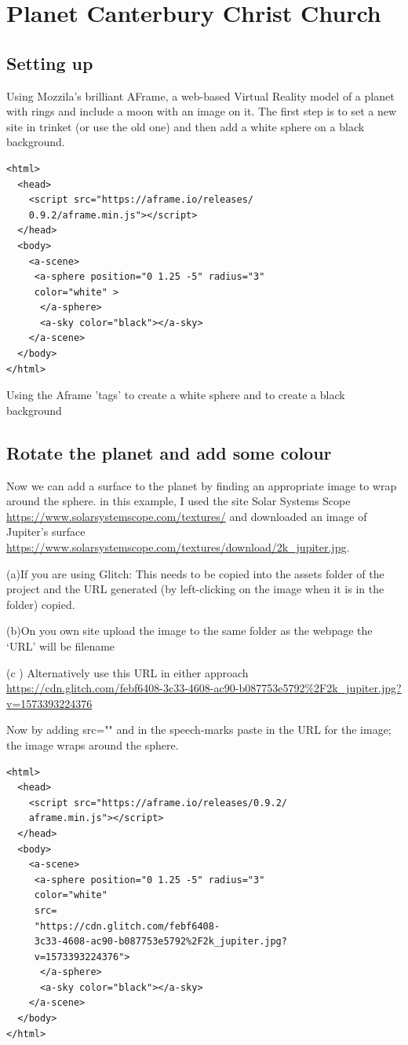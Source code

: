 \chapter{Planet Canterbury \newline Christ Church}
\section{Setting up}
Using Mozzila's brilliant AFrame, a web-based Virtual Reality model of a planet with rings and include a moon with an image on it.
The first step is to set a new site in trinket (or use the old one)  and then add a white sphere on a black background.
\begin{lstlisting}
<html>
  <head>
    <script src="https://aframe.io/releases/
    0.9.2/aframe.min.js"></script>
  </head>
  <body>
    <a-scene>
     <a-sphere position="0 1.25 -5" radius="3" 
     color="white" >
      </a-sphere>   
      <a-sky color="black"></a-sky>
    </a-scene>
  </body>
</html>
\end{lstlisting}

Using the Aframe 'tags' to create a white sphere and to create a black background

\section{Rotate the planet and add some colour}
Now we can add a surface to the planet by finding an appropriate image to wrap around the sphere. in this example, I used the site Solar Systems Scope \url{https://www.solarsystemscope.com/textures/} and downloaded an image of Jupiter's surface \url{https://www.solarsystemscope.com/textures/download/2k_jupiter.jpg}.

 

(a)If you are using Glitch: This needs to be copied into the assets folder of the project and the URL generated (by left-clicking on the image when it is in the folder) copied.

(b)On you own site upload the image to the same folder as the webpage the ‘URL’ will be filename

(c ) Alternatively use this URL in either approach \url{https://cdn.glitch.com/febf6408-3c33-4608-ac90-b087753e5792%2F2k_jupiter.jpg?v=1573393224376}

Now by adding src="" and in the speech-marks paste in the URL for the image; the image wraps around the sphere.
\begin{lstlisting}
<html>
  <head>
    <script src="https://aframe.io/releases/0.9.2/
    aframe.min.js"></script>
  </head>
  <body>
    <a-scene>
     <a-sphere position="0 1.25 -5" radius="3" 
     color="white" 
     src=
     "https://cdn.glitch.com/febf6408-
     3c33-4608-ac90-b087753e5792%2F2k_jupiter.jpg?
     v=1573393224376">
      </a-sphere>   
      <a-sky color="black"></a-sky>
    </a-scene>
  </body>
</html>
\end{lstlisting}


